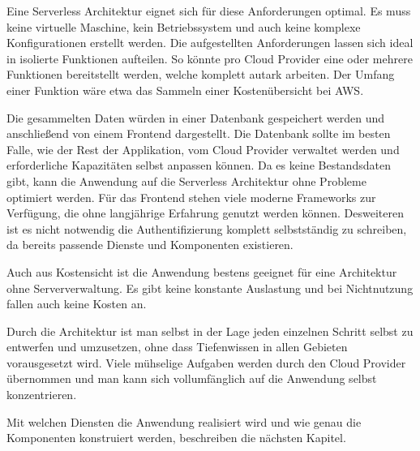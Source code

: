 Eine Serverless Architektur eignet sich für diese Anforderungen optimal.
Es muss keine virtuelle Maschine, kein Betriebssystem und auch keine komplexe Konfigurationen erstellt werden.
Die aufgestellten Anforderungen lassen sich ideal in isolierte Funktionen aufteilen.
So könnte pro Cloud Provider eine oder mehrere Funktionen bereitstellt werden, welche komplett autark arbeiten.
Der Umfang einer Funktion wäre etwa das Sammeln einer Kostenübersicht bei AWS.

Die gesammelten Daten würden in einer Datenbank gespeichert werden und anschließend von einem Frontend dargestellt.
Die Datenbank sollte im besten Falle, wie der Rest der Applikation, vom Cloud Provider verwaltet werden und erforderliche Kapazitäten selbst anpassen können.
Da es keine Bestandsdaten gibt, kann die Anwendung auf die Serverless Architektur ohne Probleme optimiert werden.
Für das Frontend stehen viele moderne Frameworks zur Verfügung, die ohne langjährige Erfahrung genutzt werden können.
Desweiteren ist es nicht notwendig die Authentifizierung komplett selbstständig zu schreiben, da bereits passende Dienste und Komponenten existieren.

Auch aus Kostensicht ist die Anwendung bestens geeignet für eine Architektur ohne Serververwaltung.
Es gibt keine konstante Auslastung und bei Nichtnutzung fallen auch keine Kosten an.


Durch die Architektur ist man selbst in der Lage jeden einzelnen Schritt selbst zu entwerfen und umzusetzen, ohne dass Tiefenwissen in allen Gebieten vorausgesetzt wird.
Viele mühselige Aufgaben werden durch den Cloud Provider übernommen und man kann sich vollumfänglich auf die Anwendung selbst konzentrieren.

Mit welchen Diensten die Anwendung realisiert wird und wie genau die Komponenten konstruiert werden, beschreiben die nächsten Kapitel.



